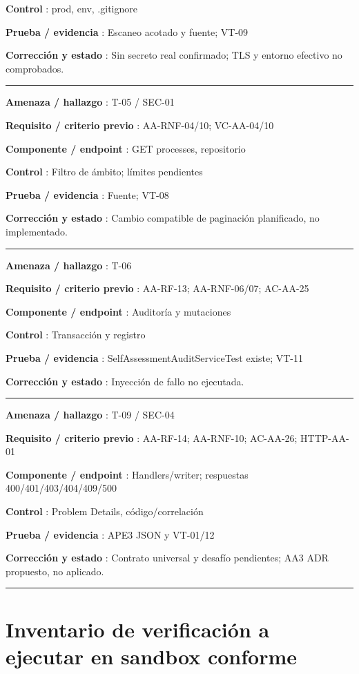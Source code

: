 \documentclass[12pt,a4paper]{report}
\begin{document}
\textbf{Control }: prod, env, .gitignore

\textbf{Prueba / evidencia }: Escaneo acotado y fuente; VT-09

\textbf{Corrección y estado }: Sin secreto real confirmado; TLS y
entorno efectivo no comprobados.

\medskip\hrule\medskip

\textbf{Amenaza / hallazgo }: T-05 / SEC-01

\textbf{Requisito / criterio previo }: AA-RNF-04/10; VC-AA-04/10

\textbf{Componente / endpoint }: GET processes, repositorio

\textbf{Control }: Filtro de ámbito; límites pendientes

\textbf{Prueba / evidencia }: Fuente; VT-08

\textbf{Corrección y estado }: Cambio compatible de paginación
planificado, no implementado.

\medskip\hrule\medskip

\textbf{Amenaza / hallazgo }: T-06

\textbf{Requisito / criterio previo }: AA-RF-13; AA-RNF-06/07; AC-AA-25

\textbf{Componente / endpoint }: Auditoría y mutaciones

\textbf{Control }: Transacción y registro

\textbf{Prueba / evidencia }: SelfAssessmentAuditServiceTest existe;
VT-11

\textbf{Corrección y estado }: Inyección de fallo no ejecutada.

\medskip\hrule\medskip

\textbf{Amenaza / hallazgo }: T-09 / SEC-04

\textbf{Requisito / criterio previo }: AA-RF-14; AA-RNF-10; AC-AA-26;
HTTP-AA-01

\textbf{Componente / endpoint }: Handlers/writer; respuestas
400/401/403/404/409/500

\textbf{Control }: Problem Details, código/correlación

\textbf{Prueba / evidencia }: APE3 JSON y VT-01/12

\textbf{Corrección y estado }: Contrato universal y desafío pendientes;
AA3 ADR propuesto, no aplicado.

\medskip\hrule\medskip

\section{Inventario de verificación a ejecutar en sandbox
conforme}\label{AA4-semana-4-anexo1-inventario-de-verificaciuxf3n-a-ejecutar-en-sandbox-conforme}
\end{document}
